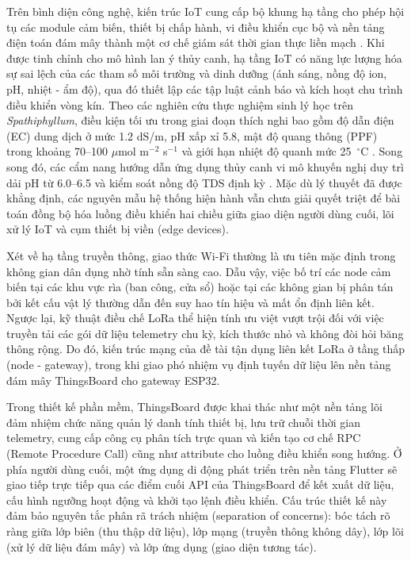 Trên bình diện công nghệ, kiến trúc IoT cung cấp bộ khung hạ tầng cho phép hội tụ các module cảm biến, thiết bị chấp hành, vi điều khiển cục bộ và nền tảng điện toán đám mây thành một cơ chế giám sát thời gian thực liền mạch \cite{wang_smart_agriculture,liu_realtime_iaq,singh_iot_air_quality}. Khi được tinh chỉnh cho mô hình lan ý thủy canh, hạ tầng IoT có năng lực lượng hóa sự sai lệch của các tham số môi trường và dinh dưỡng (ánh sáng, nồng độ ion, pH, nhiệt - ẩm độ), qua đó thiết lập các tập luật cảnh báo và kích hoạt chu trình điều khiển vòng kín. Theo các nghiên cứu thực nghiệm sinh lý học trên \textit{Spathiphyllum}, điều kiện tối ưu trong giai đoạn thích nghi bao gồm độ dẫn điện (EC) dung dịch ở mức 1.2 dS/m, pH xấp xỉ 5.8, mật độ quang thông (PPF) trong khoảng 70--100 $\mu$mol m$^{-2}$ s$^{-1}$ và giới hạn nhiệt độ quanh mức 25~$^\circ$C \cite{peace_lily_ec_ppf}. Song song đó, các cẩm nang hướng dẫn ứng dụng thủy canh vi mô khuyến nghị duy trì dải pH từ 6.0--6.5 và kiểm soát nồng độ TDS định kỳ \cite{peace_lily_hydro_brightlane}. Mặc dù lý thuyết đã được khẳng định, các nguyên mẫu hệ thống hiện hành vẫn chưa giải quyết triệt để bài toán đồng bộ hóa luồng điều khiển hai chiều giữa giao diện người dùng cuối, lõi xử lý IoT và cụm thiết bị viền (edge devices).

Xét về hạ tầng truyền thông, giao thức Wi-Fi thường là ưu tiên mặc định trong không gian dân dụng nhờ tính sẵn sàng cao. Dẫu vậy, việc bố trí các node cảm biến tại các khu vực rìa (ban công, cửa sổ) hoặc tại các không gian bị phân tán bởi kết cấu vật lý thường dẫn đến suy hao tín hiệu và mất ổn định liên kết. Ngược lại, kỹ thuật điều chế LoRa thể hiện tính ưu việt vượt trội đối với việc truyền tải các gói dữ liệu telemetry chu kỳ, kích thước nhỏ và không đòi hỏi băng thông rộng. Do đó, kiến trúc mạng của đề tài tận dụng liên kết LoRa ở tầng thấp (node - gateway), trong khi giao phó nhiệm vụ định tuyến dữ liệu lên nền tảng đám mây ThingsBoard cho gateway ESP32.

Trong thiết kế phần mềm, ThingsBoard được khai thác như một nền tảng lõi đảm nhiệm chức năng quản lý danh tính thiết bị, lưu trữ chuỗi thời gian telemetry, cung cấp công cụ phân tích trực quan và kiến tạo cơ chế RPC (Remote Procedure Call) cũng như attribute cho luồng điều khiển song hướng. Ở phía người dùng cuối, một ứng dụng di động phát triển trên nền tảng Flutter sẽ giao tiếp trực tiếp qua các điểm cuối API của ThingsBoard để kết xuất dữ liệu, cấu hình ngưỡng hoạt động và khởi tạo lệnh điều khiển. Cấu trúc thiết kế này đảm bảo nguyên tắc phân rã trách nhiệm (separation of concerns): bóc tách rõ ràng giữa lớp biên (thu thập dữ liệu), lớp mạng (truyền thông không dây), lớp lõi (xử lý dữ liệu đám mây) và lớp ứng dụng (giao diện tương tác).

